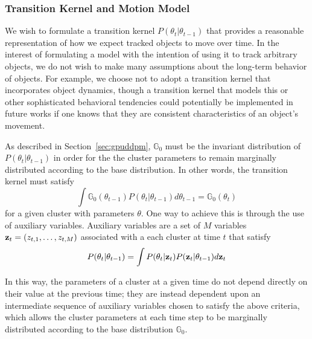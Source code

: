 \documentclass[twocolumn, final]{svjour3}
\begin{document}






\subsubsection{Transition Kernel and Motion Model}

We wish to formulate a transition kernel $P(\theta_{t} | \theta_{t-1})$ that provides a reasonable representation of how we expect tracked objects to move over time. In the interest of formulating a model with the intention of using it to track arbitrary objects, we do not wish to make many assumptions about the long-term behavior of objects. For example, we choose not to adopt a transition kernel that incorporates object dynamics, though a transition kernel that models this or other sophisticated behavioral tendencies could potentially be implemented in future works if one knows that they are consistent characteristics of an object's movement.

As described in Section~\ref{sec:gpuddpm}, $\mathbb{G}_{0}$ must be the invariant distribution of $P(\theta_{t} | \theta_{t-1})$ in order for the the cluster parameters to remain marginally distributed according to the base distribution. In other words, the transition kernel must satisfy
\begin{equation}
\int \mathbb{G}_{0}(\theta_{t-1})P(\theta_{t} | \theta_{t-1}) d\theta_{t-1} = \mathbb{G}_{0}(\theta_{t})
\end{equation}
for a given cluster with parameters $\theta$. One way to achieve this is through the use of auxiliary variables. Auxiliary variables are a set of $M$ variables $\bold{z}_{t} = (z_{t,1}, \ldots, z_{t,M})$ associated with a each cluster at time $t$ that satisfy
\begin{eqnarray}
P(\theta_{t} | \theta_{t-1}) = \int P(\theta_{t} | \bold{z}_{t}) P(\bold{z}_{t} | \theta_{t-1}) d \bold{z}_{t}  %
\end{eqnarray}

In this way, the parameters of a cluster at a given time do not depend directly on their value at the previous time; they are instead dependent upon an intermediate sequence of auxiliary variables chosen to satisfy the above criteria, which allows the cluster parameters at each time step to be marginally distributed according to the base distribution $\mathbb{G}_{0}$.
\end{document}
